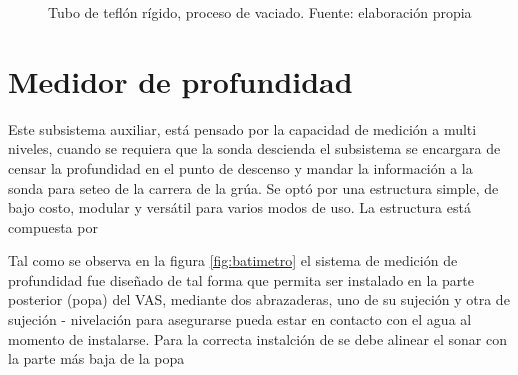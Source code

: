 \begin{figure}[ht]
\centering
{}
\caption{Tubo de tefl\'on r\'igido, proceso de vaciado. Fuente: elaboración propia}
\label{fig:preparacion}
\end{figure}


\section{Medidor de profundidad}
Este subsistema auxiliar, está pensado por la capacidad de medici\'on a multi niveles, cuando se requiera que la sonda descienda el subsistema se encargara de censar la profundidad en el punto de descenso y mandar la informaci\'on a la sonda para seteo de la carrera de la gr\'ua. Se opt\'o por una estructura simple, de bajo costo,  modular y vers\'atil para varios modos de uso.  
La estructura est\'a compuesta por

Tal como se observa en la figura \ref{fig:batimetro} el sistema de medici\'on de profundidad fue dise\~nado de tal forma que permita ser instalado en la parte posterior (popa) del VAS, mediante dos abrazaderas, uno de su sujeci\'on y otra de sujeci\'on - nivelaci\'on para asegurarse  pueda estar en contacto con el agua al momento de instalarse.  Para la correcta  instalci\'on de se debe alinear el sonar con la parte m\'as baja de la popa 

